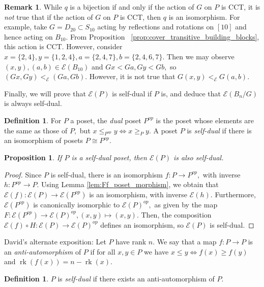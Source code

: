 \documentclass[10 pt]{amsart}
\theoremstyle{plain}
\newtheorem{prop}[thm]{Proposition}
\theoremstyle{definition}
\newtheorem{defn}[thm]{Definition}
\newtheorem{rem}[thm]{Remark}
\theoremstyle{remark}
\numberwithin{equation}{section}
\newcommand\rk{\operatorname{rk}}
\renewcommand{\iff}{\Leftrightarrow}
\begin{document}
\begin{rem}
While $q$ is a bijection if and only if the action of $G$ on $P$ is CCT, it is {\it not} true that if the action of $G$ on $P$ is CCT, then $q$ is an isomorphism.  For example, take $G=D_{20} \subset S_{10}$ acting by reflections and rotations on $[10]$ and hence acting on $B_{10}.$ From Proposition ~\ref{prop:cover_transitive_building_blocks}, this action is CCT. However, consider $x = \{2,4\},y = \{1,2,4\},a = \{2,4,7\},b = \{2,4,6,7\}.$ Then we may observe $(x , y),(a, b) \in \mathcal E(B_{10})$ and $Gx < Ga, Gy < Gb,$ so $(Gx, Gy) <_{\mathcal E} (Ga, Gb).$ However, it is not true that $G(x, y)<_{\mathcal E} G(a,b)$.
\end{rem}

Finally, we will prove that $\mathcal E(P)$ is self-dual if $P$ is, and deduce that $\mathcal E(B_n/G)$ is always self-dual. 
\begin{defn}
For $P$ a poset, the {\it dual} poset $P^{op}$ is the poset whose elements are the same as those of $P,$ but $x \leq_{P^{op}} y \iff x \geq_P y.$ A poset $P$ is {\it self-dual} if there is an isomorphism of posets $P \cong P^{op}.$
\end{defn}

\begin{prop}
\label{prop:self_dual_preservation}
If $P$ is a self-dual poset, then $\mathcal E(P)$ is also self-dual.
\end{prop}
\begin{proof}
Since $P$ is self-dual, there is an isomorphism $f:P \rightarrow P^{op},$ with inverse $h:P^{op}\rightarrow P.$ Using Lemma \ref{lem:Ff_poset_morphism}, we obtain that $\mathcal E(f):\mathcal E(P) \rightarrow \mathcal E(P^{op})$ is an isomorphism, with inverse $\mathcal E(h).$ Furthermore, $\mathcal E(P^{op})$ is canonically isomorphic to $\mathcal E(P)^{op},$ as given by the map $F:\mathcal E(P^{op}) \rightarrow \mathcal E(P)^{op},(x,y) \mapsto (x,y).$ Then, the composition $\mathcal E(f) \circ H:\mathcal E(P) \rightarrow \mathcal E(P)^{op}$ defines an isomorphism, so $\mathcal E(P)$ is self-dual.
\end{proof}

\iffalse
David's alternate exposition:
Let $P$ have rank $n$.  We say that a map $f\colon P\rightarrow P$ is an \textit{anti-automorphism} of $P$ if for all $x,y\in P$ we have $x\le y\iff f(x)\ge f(y)$ and $\rk(f(x)) = n-\rk(x)$.

\begin{defn}
$P$ is \textit{self-dual} if there exists an anti-automorphism of $P$.
\end{defn}
\end{document}
